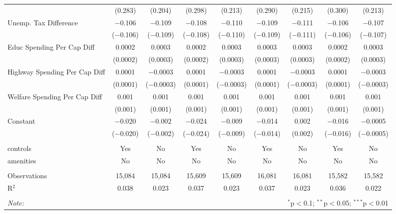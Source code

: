\begin{table}[!htbp]
\begin{tabular}{@{\extracolsep{5pt}}lcccccccc}
  & (0.283) & (0.204) & (0.298) & (0.213) & (0.290) & (0.215) & (0.300) & (0.213) \\ 
  Unemp. Tax Difference & $-$0.106 & $-$0.109 & $-$0.108 & $-$0.110 & $-$0.109 & $-$0.111 & $-$0.106 & $-$0.107 \\ 
  & ($-$0.106) & ($-$0.109) & ($-$0.108) & ($-$0.110) & ($-$0.109) & ($-$0.111) & ($-$0.106) & ($-$0.107) \\ 
  Educ Spending Per Cap Diff & 0.0002 & 0.0003 & 0.0002 & 0.0003 & 0.0003 & 0.0003 & 0.0002 & 0.0003 \\ 
  & (0.0002) & (0.0003) & (0.0002) & (0.0003) & (0.0003) & (0.0003) & (0.0002) & (0.0003) \\ 
  Highway Spending Per Cap Diff & 0.0001 & $-$0.0003 & 0.0001 & $-$0.0003 & 0.0001 & $-$0.0003 & 0.0001 & $-$0.0003 \\ 
  & (0.0001) & ($-$0.0003) & (0.0001) & ($-$0.0003) & (0.0001) & ($-$0.0003) & (0.0001) & ($-$0.0003) \\ 
  Welfare Spending Per Cap Diff & 0.001 & 0.001 & 0.001 & 0.001 & 0.001 & 0.001 & 0.001 & 0.001 \\ 
  & (0.001) & (0.001) & (0.001) & (0.001) & (0.001) & (0.001) & (0.001) & (0.001) \\ 
  Constant & $-$0.020 & $-$0.002 & $-$0.024 & $-$0.009 & $-$0.014 & 0.002 & $-$0.016 & $-$0.0005 \\ 
  & ($-$0.020) & ($-$0.002) & ($-$0.024) & ($-$0.009) & ($-$0.014) & (0.002) & ($-$0.016) & ($-$0.0005) \\ 
 \hline \\[-1.8ex] 
controls & Yes & No & Yes & No & Yes & No & Yes & No \\ 
amenities & No & No & No & No & No & No & No & No \\ 
\hline \\[-1.8ex] 
Observations & 15,084 & 15,084 & 15,609 & 15,609 & 16,081 & 16,081 & 15,582 & 15,582 \\ 
R$^{2}$ & 0.038 & 0.023 & 0.037 & 0.023 & 0.037 & 0.023 & 0.036 & 0.022 \\ 
\hline 
\hline \\[-1.8ex] 
\textit{Note:}  & \multicolumn{8}{r}{$^{*}$p$<$0.1; $^{**}$p$<$0.05; $^{***}$p$<$0.01} \\ 
\end{tabular} 
\end{table} 
